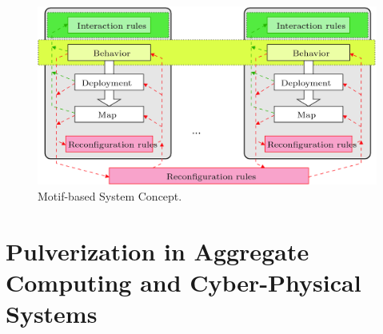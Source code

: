 \begin{figure}
	\centering
	\includegraphics[width=0.8\linewidth]{figures/motif-concept.png}
	\caption{Motif-based System Concept.}
	\label{fig:motif-concept}
\end{figure}


\section{Pulverization in Aggregate Computing and Cyber-Physical Systems}
\label{sec:pulverization-aggregate-computing-cps}
